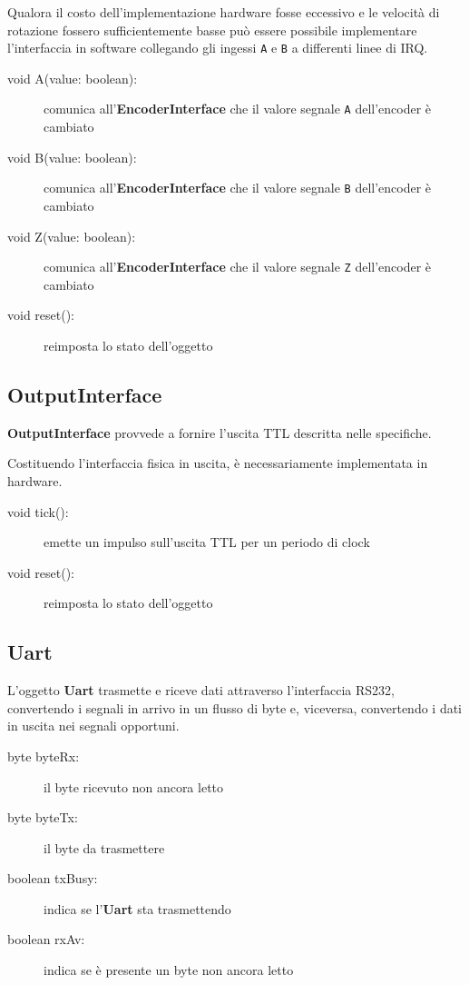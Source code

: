 \documentclass [11pt,a4paper,oneside]{paper}
\newcommand{\component}[1]{\textbf{#1}}
\newcommand{\identifier}[1]{\texttt{#1}}
\begin{document}
Qualora il costo dell'implementazione hardware fosse eccessivo e
le velocità di rotazione fossero sufficientemente basse può essere
possibile implementare l'interfaccia in software collegando gli
ingessi \identifier{A} e \identifier{B} a differenti linee di IRQ.

\begin{description}
\item[void A(value: boolean):] comunica all'\component{EncoderInterface} che
    il valore segnale \identifier{A} dell'encoder è cambiato
\item[void B(value: boolean):] comunica all'\component{EncoderInterface} che
    il valore segnale \identifier{B} dell'encoder è cambiato
\item[void Z(value: boolean):] comunica all'\component{EncoderInterface} che
    il valore segnale \identifier{Z} dell'encoder è cambiato
\item[void reset():] reimposta lo stato dell'oggetto
\end{description}

\subsection{OutputInterface}
\component{OutputInterface} provvede a fornire l'uscita TTL descritta nelle
specifiche.

Costituendo l'interfaccia fisica in uscita, è necessariamente implementata in
hardware.

\begin{description}
\item[void tick():] emette un impulso sull'uscita TTL per un periodo di clock
\item[void reset():] reimposta lo stato dell'oggetto
\end{description}

\subsection{Uart}
L'oggetto \component{Uart} trasmette e riceve dati attraverso l'interfaccia RS232,
convertendo i segnali in arrivo in un flusso di byte e, viceversa, convertendo
i dati in uscita nei segnali opportuni.

\begin{description}
\item[byte byteRx:] il byte ricevuto non ancora letto
\item[byte byteTx:] il byte da trasmettere
\item[boolean txBusy:] indica se l'\component{Uart} sta trasmettendo
\item[boolean rxAv:] indica se è presente un byte non ancora letto
\end{description}
\end{document}
